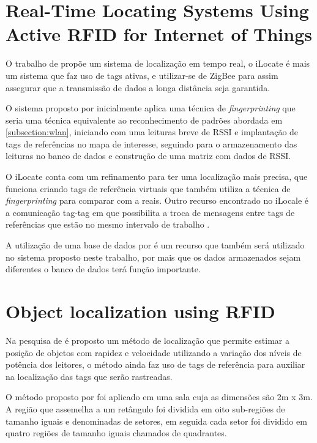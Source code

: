 \section{Real-Time Locating Systems Using Active RFID for Internet of Things}
O trabalho de \citeauthor{realtimeRFID2016} propõe um sistema de localização em tempo real, o iLocate é mais um sistema que faz uso de tags ativas, e  utilizar-se de ZigBee para assim assegurar que a transmissão de dados a longa distância seja garantida. 
\par
O sistema proposto por \citeauthor{realtimeRFID2016} inicialmente aplica uma técnica de \textit{fingerprinting} que seria uma técnica equivalente ao reconhecimento de padrões abordada em \autoref{subsection:wlan}, iniciando com uma leituras breve de RSSI e implantação de tags de referências no mapa de interesse, seguindo para o armazenamento das leituras no banco de dados e construção de uma matriz com dados de RSSI. 
\par 
O iLocate conta com um refinamento para ter uma localização mais precisa, que funciona criando tags de referência virtuais que também utiliza a técnica de \textit{fingerprinting} para comparar com a reais. Outro recurso encontrado no iLocale é a comunicação tag-tag em que possibilita a troca de mensagens entre tags de referências que estão no mesmo intervalo de trabalho \cite{realtimeRFID2016}.
\par
A utilização de uma base de dados por \citeauthor{realtimeRFID2016} é um recurso que também será utilizado no sistema proposto neste trabalho, por mais que os dados armazenados sejam diferentes o banco de dados terá função importante.

\section{Object localization using RFID}
Na pesquisa de \citeauthor{localization2010} é proposto um método de localização que permite estimar a posição de objetos com rapidez e velocidade utilizando a variação dos níveis de potência dos leitores, o método ainda faz uso de tags de referência para auxiliar na localização das tags que serão rastreadas.

\par
O método proposto por \citeauthor{localization2010} foi aplicado em uma sala cuja as dimensões são 2m x 3m. A região que assemelha a um retângulo foi dividida em oito sub-regiões de tamanho iguais e denominadas de setores, em seguida cada setor foi dividido em quatro regiões de tamanho iguais chamados de quadrantes.

